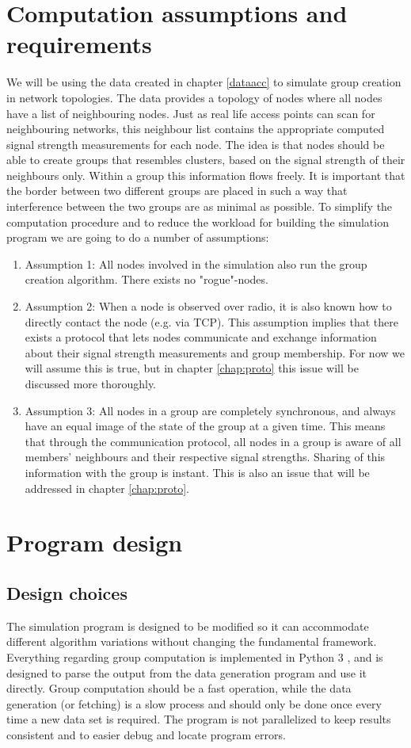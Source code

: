 \section{Computation assumptions and requirements}
We will be using the data created in chapter \ref{dataacc} to simulate group creation in network topologies. The data provides a topology of nodes where all nodes have a list of neighbouring nodes.
Just as real life access points can scan for neighbouring networks, this neighbour list contains the appropriate computed signal strength measurements for each node.
The idea is that nodes should be able to create groups that resembles clusters, based on the signal strength of their neighbours only. Within a group this information flows freely.
It is important that the border between two different groups are placed in such a way that interference between the two groups are as minimal as possible.
To simplify the computation procedure and to reduce the workload for building the simulation program we are going to do a number of assumptions:
    \begin{enumerate}
    \item Assumption 1: All nodes involved in the simulation also run the group creation algorithm. There exists no "rogue"-nodes.  
		\item Assumption 2: When a node is observed over radio, it is also known how to directly contact the node (e.g. via TCP). This assumption implies that there exists a protocol that lets nodes communicate and exchange information about their signal strength measurements and group membership. For now we will assume this is true, but in chapter \ref{chap:proto} this issue will be discussed more thoroughly. 
		\item Assumption 3: All nodes in a group are completely synchronous, and always have an equal image of the state of the group at a given time. This means that through the communication protocol, all nodes in a group is aware of all members' neighbours and their respective signal strengths. Sharing of this information with the group is instant. This is also an issue that will be addressed in chapter \ref{chap:proto}. 
    \end{enumerate}
\section{Program design}
\subsection{Design choices}
The simulation program is designed to be modified so it can accommodate different algorithm variations without changing the fundamental framework.
Everything regarding group computation is implemented in Python 3 \cite{Python3}, and is designed to parse the output from the data generation program and use it directly.
Group computation should be a fast operation, while the data generation (or fetching) is a slow process and should only be done once every time a new data set is required.
The program is not parallelized to keep results consistent and to easier debug and locate program errors. 

